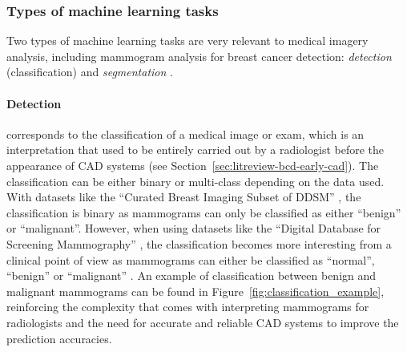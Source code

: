 \subsubsection{Types of machine learning tasks}

Two types of machine learning tasks are very relevant to medical imagery analysis, including mammogram analysis for breast cancer detection: \textit{detection} (classification) and \textit{segmentation} \citep{Litjens2017}. 

\paragraph{Detection} corresponds to the classification of a medical image or exam, which is an interpretation that used to be entirely carried out by a radiologist before the appearance of CAD systems (see Section~\ref{sec:litreview-bcd-early-cad}). The classification can be either binary or multi-class depending on the data used. With datasets like the ``Curated Breast Imaging Subset of DDSM'' \citep{Lee2017}, the classification is binary as mammograms can only be classified as either ``benign'' or ``malignant''. However, when using datasets like the ``Digital Database for Screening Mammography'' \citep{DDSMdataset2001}, the classification becomes more interesting from a clinical point of  view as mammograms can either be classified as ``normal'', ``benign'' or ``malignant'' \citep{Litjens2017}. An example of classification between benign and malignant mammograms can be found in Figure~\ref{fig:classification_example}, reinforcing the complexity that comes with interpreting mammograms for radiologists and the need for accurate and reliable CAD systems to improve the prediction accuracies.

